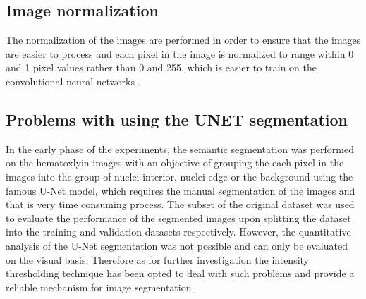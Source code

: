 \subsection{Image normalization}
The normalization of the images are performed in order to ensure that the images are easier to process and each pixel in the image is normalized to range within 0 and 1 pixel values rather than 0 and 255, which is easier to train on the convolutional neural networks \citep{rashid_2019}.  

\subsection{Problems with using the UNET segmentation }
In the early phase of the experiments, the semantic segmentation was performed on the hematoxlyin images with an objective of grouping the each pixel in the images into the group of nuclei-interior, nuclei-edge or the background using the famous U-Net model, which requires the manual segmentation of the images and that is very time consuming process.
The subset of the original dataset was used to evaluate the performance of the segmented images upon splitting the dataset into the training and validation datasets respectively. 
However, the quantitative analysis of the U-Net segmentation was not possible and can only be evaluated on the visual basis. 
Therefore as for further investigation the intensity thresholding technique has been opted to deal with such problems and provide a reliable mechanism for image segmentation. 